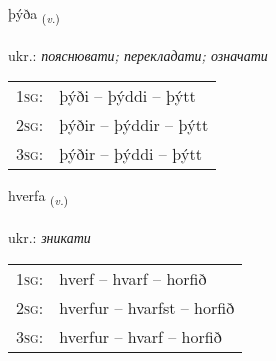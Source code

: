 \documentclass[frontgrid, backgrid]{flacards}\usepackage[]{graphicx}\usepackage[]{xcolor}
\begin{document}
\renewcommand{\flhead}{\vskip5pt \fboxsep=0pt {\small\bfseries\footnotesize Sagnorð | дієслово}}
\renewcommand{\fcfoot}{\vskip5pt \fboxsep=0pt \hspace{2pt}{\small\bfseries\footnotesize 1K}}

\renewcommand{\blhead}{\vskip5pt {\small\bfseries\footnotesize Sagnorð | дієслово }}
\renewcommand{\bcfoot}{\vskip5pt \hspace{2pt}{\small\bfseries\footnotesize 1K}}


{þýða \small{\textsubscript{(\textit{v.})}} \\[1ex] %
\textphonetic{[θiːða]} \\
ukr.: \emph{пояснювати; перекладати; означати} \\  [2ex]
\renewcommand*{\arraystretch}{0.8}
\begin{tabular}{p{1cm}l}
\textsc{1sg}: & þýði -- þýddi -- þýtt \\ 
\textsc{2sg}: & þýðir -- þýddir -- þýtt \\ 
\textsc{3sg}: & þýðir -- þýddi -- þýtt \\ 
\end{tabular}
}

\renewcommand{\flhead}{\vskip5pt \fboxsep=0pt {\small\bfseries\footnotesize Sagnorð | дієслово}}
\renewcommand{\fcfoot}{\vskip5pt \fboxsep=0pt \hspace{2pt}{\small\bfseries\footnotesize 1K}}

\renewcommand{\blhead}{\vskip5pt {\small\bfseries\footnotesize Sagnorð | дієслово }}
\renewcommand{\bcfoot}{\vskip5pt \hspace{2pt}{\small\bfseries\footnotesize 1K}}


{hverfa \small{\textsubscript{(\textit{v.})}} \\[1ex] %
\textphonetic{[kʰvɛrva]} \\
ukr.: \emph{зникати} \\  [2ex]
\renewcommand*{\arraystretch}{0.8}
\begin{tabular}{p{1cm}l}
\textsc{1sg}: & hverf -- hvarf -- horfið \\ 
\textsc{2sg}: & hverfur -- hvarfst -- horfið \\ 
\textsc{3sg}: & hverfur -- hvarf -- horfið \\ 
\end{tabular}
}
\end{document}
